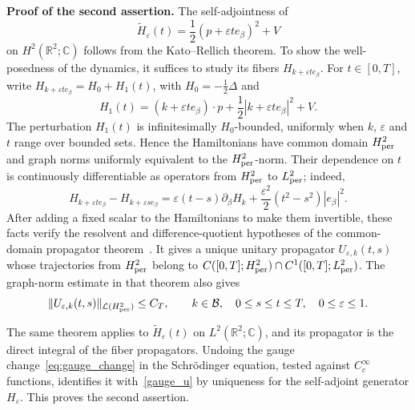 \documentclass[a4paper,11pt]{article}
\theoremstyle{plain}
\theoremstyle{remark}
\def\R{{\mathbb R}}
\def\C{{\mathbb C}}
\def\eps{{\varepsilon}}
\begin{document}
\medskip

{\bf Proof of the second assertion.}
The self-adjointness of
\[
\widetilde H_\eps(t)=\frac12(p+\eps te_\beta)^2+V
\]
on $H^2(\R^2;\C)$ follows from the Kato--Rellich theorem.
To show the well-posedness of the dynamics, it suffices to study its
fibers $H_{k+\eps te_\beta}$. For $t\in[0,T]$, write
$H_{k+\eps te_\beta}=H_0+H_1(t)$, with $H_0=-\frac12\Delta$ and
\[
H_1(t)=(k+\eps te_\beta)\cdot p+\frac12|k+\eps te_\beta|^2+V.
\]
The perturbation $H_1(t)$ is infinitesimally $H_0$-bounded, uniformly
when $k$, $\eps$ and $t$ range over bounded sets. Hence the Hamiltonians
have common domain $H^2_{\rm per}$ and graph norms uniformly equivalent
to the $H^2_{\rm per}$-norm. Their dependence on $t$ is continuously
differentiable as operators from $H^2_{\rm per}$ to $L^2_{\rm per}$;
indeed,
\[
H_{k+\eps te_\beta}-H_{k+\eps se_\beta}
=\eps(t-s)\partial_\beta H_k
+\frac{\eps^2}{2}(t^2-s^2)|e_\beta|^2.
\]
After adding a fixed scalar to the Hamiltonians to make them invertible,
these facts verify the resolvent and difference-quotient hypotheses of
the common-domain propagator theorem~\cite[Theorem~X.70]{ReedSimon2}.
It gives a unique unitary propagator $U_{\eps,k}(t,s)$ whose trajectories
from $H^2_{\rm per}$ belong to
$C([0,T];H^2_{\rm per})\cap C^1([0,T];L^2_{\rm per})$.
The graph-norm estimate in that theorem also gives
\begin{equation}\label{eq:propagator_H2}
\|U_{\eps,k}(t,s)\|_{\mathcal L(H^2_{\rm per})}\le C_T,
\qquad k\in\mathcal B,\quad 0\le s\le t\le T,\quad 0\le\eps\le1.
\end{equation}

The same theorem applies to $\widetilde H_\eps(t)$ on
$L^2(\R^2;\C)$, and its propagator is the direct integral of the fiber
propagators. Undoing the gauge change~\eqref{eq:gauge_change} in the
Schr\"odinger equation, tested against $C_c^\infty$ functions, identifies
it with~\eqref{gauge_u} by uniqueness for the self-adjoint generator
$H_\eps$. This proves the second assertion.
\end{document}
